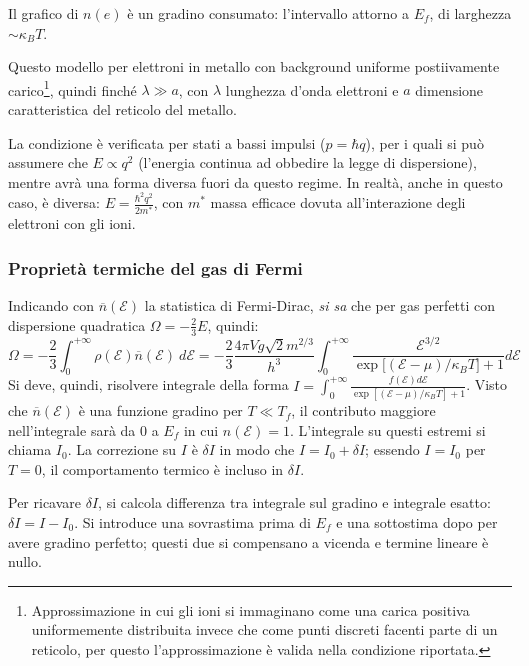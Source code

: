 \documentclass[10pt, a4paper]{scrartcl}
\numberwithin{equation}{subsection}
\theoremstyle{style1}
\begin{document}
Il grafico di $n(e)$ \`e un gradino consumato: l'intervallo attorno a $E_f$, di larghezza $\sim \kappa _B T$. 

Questo modello per elettroni in metallo con background uniforme postiivamente carico\footnote{Approssimazione in cui gli ioni si immaginano come una carica positiva uniformemente distribuita invece che come punti discreti facenti parte di un reticolo, per questo l'approssimazione \`e valida nella condizione riportata.}, quindi finch\'e $\lambda \gg a$, con $\lambda $ lunghezza d'onda elettroni e $a$ dimensione caratteristica del reticolo del metallo.

La condizione \`e verificata per stati a bassi impulsi ($p = \hbar  q$), per i quali si pu\`o assumere che $E \propto q^2$ (l'energia continua ad obbedire la legge di dispersione), mentre avr\`a una forma diversa fuori da questo regime. 
In realt\`a, anche in questo caso, \`e diversa: $E = \frac{\hbar ^2 q^2}{2m^*}$, con $m^*$ massa efficace dovuta all'interazione degli elettroni con gli ioni.

\subsubsection{Propriet\`a termiche del gas di Fermi}
Indicando con $\overline{n}(\mathscr{E})$ la statistica di Fermi-Dirac, \textit{si sa} che per gas perfetti con dispersione quadratica $\Omega = -\frac{2}{3}E$, quindi:
\[
	\Omega = -\frac{2}{3} \int_{0} ^{+\infty} \rho (\mathscr{E}) \overline{n}(\mathscr{E}) \ d \mathscr{E}= -\frac{2}{3} \frac{4 \pi V g \sqrt{2} m^{2 / 3} }{h^3}\int_{0} ^{+\infty} \frac{\mathscr{E}^{3/2} }{\exp \big[(\mathscr{E}-\mu) / \kappa _BT \big] + 1} d \mathscr{E}
\] 
Si deve, quindi, risolvere integrale della forma $I = \int_{0} ^{+\infty} \frac{f(\mathscr{E}) d \mathscr{E}}{\exp\left[ (\mathscr{E}-\mu ) / \kappa _ BT \right] +1}$.
Visto che $\overline{n}(\mathscr{E})$ \`e una funzione gradino per $T \ll T_f$, il contributo maggiore nell'integrale sar\`a da $0$ a $E_f$ in cui $n(\mathscr{E}) = 1$.
L'integrale su questi estremi si chiama $I_0$. La correzione su $I$ \`e $\delta I$ in modo che $I = I_0 + \delta I$; essendo $I = I_0$ per $T=0$, il comportamento termico \`e incluso in $\delta I$.

Per ricavare $\delta I$, si calcola differenza tra integrale sul gradino e integrale esatto: $\delta I = I - I_0$. Si introduce una sovrastima prima di $E_f$ e una sottostima dopo per avere gradino perfetto; questi due si compensano a vicenda e termine lineare \`e nullo.
\end{document}
